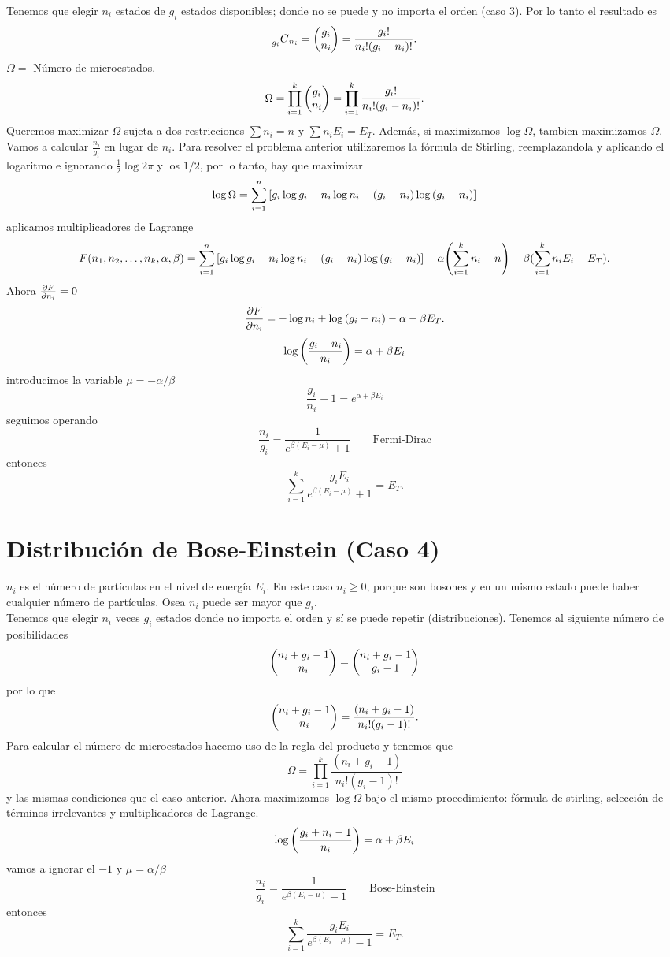 Tenemos que elegir $n_i$ estados de $g_i$ estados disponibles; donde no se puede y no importa el orden (caso 3). Por lo tanto el resultado es
	$$ \prescript{}{g_i}{C}_{n_i} = \mqty(g_i \\ n_i) = \frac{g_i !}{n_i ! (g_i - n_i)!}. $$
$\Omega = $ Número de microestados.
	$$ \Omega = \prod _{i=1} ^k \mqty(g_i \\ n_i) = \prod _{i=1} ^k \frac{g_i !}{n_i ! (g_i - n_i)!}. $$
Queremos maximizar $\Omega$ sujeta a dos restricciones $\sum n_i = n$ y $\sum n_i E_i = E_T$. Además, si maximizamos $\log{\Omega}$, tambien maximizamos $\Omega$. Vamos a calcular $\frac{n_i}{g_i}$ en lugar de $n_i$. Para resolver el problema anterior utilizaremos la fórmula de Stirling, reemplazandola y aplicando el logaritmo e ignorando $\frac{1}{2} \log{2\pi}$ y los $1/2$, por lo tanto, hay que maximizar
	$$ \log{\Omega} = \sum _{i=1} ^n \qty[g_i \log{g_i} - n_i \log{n_i} - (g_i - n_i)\log{(g_i - n_i)}] $$
aplicamos multiplicadores de Lagrange
	$$ F(n_1,n_2,\ldots,n_k,\alpha,\beta) = \sum _{i=1} ^n \qty[g_i \log{g_i} - n_i \log{n_i} - (g_i - n_i)\log{(g_i - n_i)}] - \alpha \qty(\sum _{i=1} ^k n_i - n) - \beta (\sum _{i=1} ^k n_i E_i - E_T). $$
Ahora $\pdv{F}{n_i} = 0$
	$$ \pdv{F}{n_i} = -\log{n_i} + \log{(g_i - n_i)} - \alpha - \beta E_T. $$
	$$ \log{\qty(\frac{g_i - n_i}{n_i})} = \alpha + \beta E_i $$
introducimos la variable $\mu = -\alpha / \beta$
	$$ \frac{g_i}{n_i} - 1 = e^{\alpha + \beta E_i} $$
seguimos operando
	$$ \frac{n_i}{g_i} = \frac{1}{e^{\beta (E_i - \mu)} + 1} \qquad \text{Fermi-Dirac} $$
entonces
	$$ \sum _{i=1} ^k \frac{g_i E_i}{e^{\beta (E_i - \mu)} + 1} = E_T. $$


\section{Distribución de Bose-Einstein (Caso 4)}
$n_i$ es el número de partículas en el nivel de energía $E_i$. En este caso $n_i \geq 0$, porque son bosones y en un mismo estado puede haber cualquier número de partículas. Osea $n_i$ puede ser mayor que $g_i$. \\

Tenemos que elegir $n_i$ veces $g_i$ estados donde no importa el orden y sí se puede repetir (distribuciones). Tenemos al siguiente número de posibilidades
	$$ \mqty(n_i + g_i - 1 \\ n_i) = \mqty(n_i + g_i - 1 \\ g_i - 1) $$
por lo que
	$$ \mqty(n_i + g_i - 1 \\ n_i) = \frac{(n_i + g_i - 1)}{n_i ! (g_i - 1)!}. $$
Para calcular el número de microestados hacemo uso de la regla del producto y tenemos que
	$$ \Omega = \prod _{i=1} ^k \frac{(n_i + g_i - 1)}{n_i ! (g_i - 1)!} $$
y las mismas condiciones que el caso anterior. Ahora maximizamos $\log{\Omega}$ bajo el mismo procedimiento: fórmula de stirling, selección de términos irrelevantes y multiplicadores de Lagrange.
	$$ \log{\qty(\frac{g_i + n_i - 1}{n_i})} = \alpha + \beta E_i $$
vamos a ignorar el $-1$ y $\mu = \alpha / \beta$
	$$ \frac{n_i}{g_i} = \frac{1}{e^{\beta (E_i - \mu)} - 1} \qquad \text{Bose-Einstein} $$
entonces
	$$ \sum _{i=1} ^k \frac{g_i E_i}{e^{\beta (E_i - \mu)} - 1} = E_T. $$


